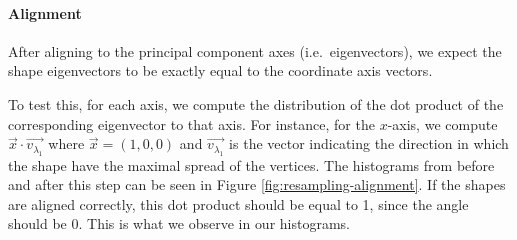 \paragraph{Alignment}
After aligning to the principal component axes (i.e.\ eigenvectors), we expect the shape eigenvectors to be exactly equal to the coordinate axis vectors.

To test this, for each axis, we compute the distribution of the dot product of the corresponding eigenvector to that axis.
For instance, for the $x$-axis, we compute $ \overrightarrow{x} \cdot \overrightarrow{v_{\lambda_1}}$ where $\overrightarrow{x} = (1, 0, 0)$ and $\overrightarrow{v_{\lambda_1}}$ is the vector indicating the direction in which the shape have the maximal spread of the vertices.
The histograms from before and after this step can be seen in Figure \ref{fig:resampling-alignment}.
If the shapes are aligned correctly, this dot product should be equal to 1, since the angle should be 0.
This is what we observe in our histograms.

